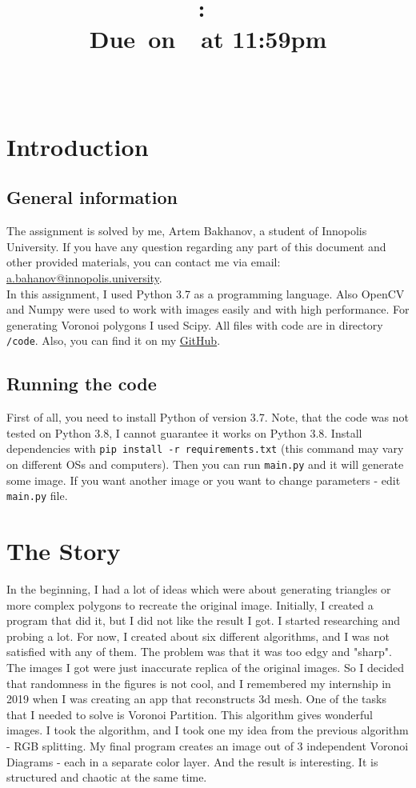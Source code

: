 \documentclass{article}
\title{
    \vspace{2in}
    \textmd{\textbf{\hmwkClass:\ \hmwkTitle}}\\
    \normalsize\vspace{0.1in}\small{Due\ on\ \hmwkDueDate\ at 11:59pm}\\
    \vspace{0.1in}\large{\textit{\hmwkClassInstructor\ }}
    \vspace{3in}
}
\author{\hmwkAuthorName}
\date{}
\begin{document}
\maketitle

\pagebreak

\tableofcontents

\pagebreak

\section{Introduction}
\subsection{General information}
    The assignment is solved by me, Artem Bakhanov, a student of Innopolis University. If you have any question regarding any part of this document and other provided materials, you can contact me via email: \href{mailto:a.bahanov@innopolis.university}{a.bahanov@innopolis.university}.\\
    In this assignment, I used Python 3.7 as a programming language. Also OpenCV and Numpy were used to work with images easily and with high performance. For generating Voronoi polygons I used Scipy. All files with code are in directory \texttt{/code}. Also, you can find it on my \href{https://github.com/artembakhanov/ComputerCanDoArt}{GitHub}.
\subsection{Running the code}
First of all, you need to install Python of version 3.7. Note, that the code was not tested on Python 3.8, I cannot guarantee it works on Python 3.8. Install dependencies with \texttt{pip install -r requirements.txt} (this command may vary on different OSs and computers). Then you can run \texttt{main.py} and it will generate some image. If you want another image or you want to change parameters - edit \texttt{main.py} file. 

\section{The Story}
In the beginning, I had a lot of ideas which were about generating triangles or more complex polygons to recreate the original image. Initially, I created a program that did it, but I did not like the result I got. I started researching and probing a lot. For now, I created about six different algorithms, and I was not satisfied with any of them. The problem was that it was too edgy and "sharp". The images I got were just inaccurate replica of the original images. So I decided that randomness in the figures is not cool, and I remembered my internship in 2019 when I was creating an app that reconstructs 3d mesh. One of the tasks that I needed to solve is Voronoi Partition. This algorithm gives wonderful images. I took the algorithm, and I took one my idea from the previous algorithm - RGB splitting. My final program creates an image out of 3 independent Voronoi Diagrams - each in a separate color layer. And the result is interesting. It is structured and chaotic at the same time.
\end{document}
